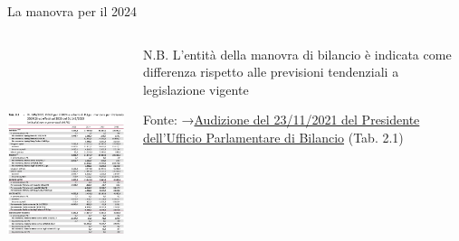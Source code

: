 \documentclass[aspectratio=149,11pt,italian]{beamer}
\begin{document}
\begin{frame}{La manovra per il 2024}
\begin{columns}
\begin{column}{.75\columnwidth}
\vspace{-3mm}
\begin{center}
\includegraphics[height=7.5cm]{./figure/audizione-UPB-DDL-bilancio-2024-tab-3-1.png}
\end{center}
\end{column}

\begin{column}{.25\columnwidth}
\footnotesize
N.B. L'entità della manovra di bilancio è indicata come
differenza rispetto alle previsioni tendenziali \alert{a legislazione vigente}

\vspace{5mm}

\tiny Fonte: →\href{https://www.upbilancio.it/wp-content/uploads/2021/11/Audizione-UPB-DDL-bilancio-2022.pdf}{Audizione del 23/11/2021 del Presidente dell'Ufficio Parlamentare di Bilancio} (Tab. 2.1)
\end{column}
\end{columns}
\end{frame}
\end{document}
